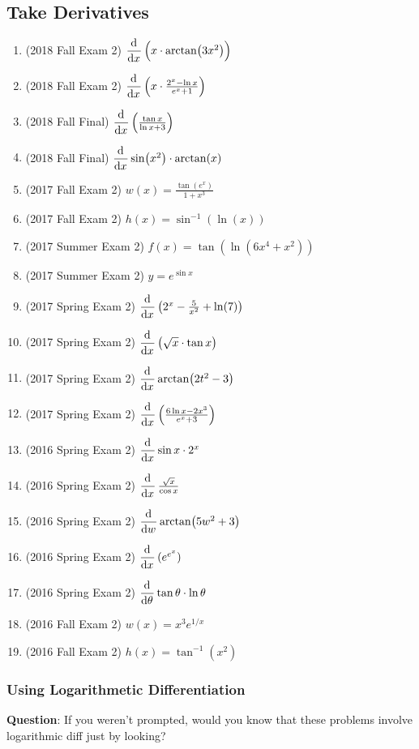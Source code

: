 \documentclass[10pt]{scrartcl}
\newcommand{\inv}{^{-1}}
\begin{document}
\subsection{Take Derivatives}
\begin{enumerate}
\item (2018 Fall Exam 2) $\dod{}{x}\left(x \cdot \arctan(3x^2)\right)$
\item (2018 Fall Exam 2) $\dod{}{x}\left(x \cdot \frac{2^x - \ln x}{e^x + 1} \right)$
\item (2018 Fall Final) $\dod{}{x}\left( \frac{\tan x}{\ln x + 3} \right)$
\item (2018 Fall Final) $\dod{}{x} \sin(x^2) \cdot \arctan(x)$
\item (2017 Fall Exam 2) $w(x) = \frac{\tan(e^x)}{1+x^3}$
\item (2017 Fall Exam 2) $h(x) = \sin\inv(\ln(x))$
\item (2017 Summer Exam 2) $f(x) = \tan(\ln(6x^4+x^2))$
\item (2017 Summer Exam 2) $y = e^{\sin x}$
\item (2017 Spring Exam 2) $\dod{}{x}\left( 2^x - \frac{5}{x^2} + \ln(7) \right)$
\item (2017 Spring Exam 2) $\dod{}{x}\left(\sqrt x \cdot \tan x\right)$
\item (2017 Spring Exam 2) $\dod{}{x} \arctan(2t^2 - 3)$
\item (2017 Spring Exam 2) $\dod{}{x} \left( \frac{6\ln x-2x^3}{e^x+3} \right)$
\item (2016 Spring Exam 2) $\dod{}{x} \sin x \cdot 2^x$
\item (2016 Spring Exam 2) $\dod{}{x}  \frac{\sqrt{x}}{\cos x}$
\item (2016 Spring Exam 2) $\dod{}{w} \arctan(5w^2 + 3)$
\item (2016 Spring Exam 2) $\dod{}{x}(e^{e^x})$
\item (2016 Spring Exam 2) $\dod{}{\theta} \tan\theta \cdot \ln\theta$
\item (2016 Fall Exam 2) $w(x) = x^3 e^{1/x}$
\item (2016 Fall Exam 2) $h(x) = \tan\inv(x^2)$
\end{enumerate}

\subsubsection{Using Logarithmetic Differentiation}
\textbf{Question}: If you weren't prompted, would you know that these problems involve logarithmic diff just by looking?
\end{document}
